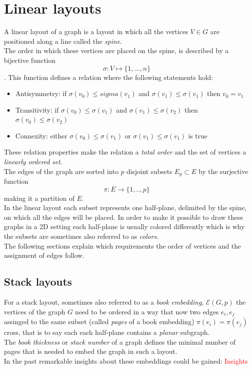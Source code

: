 \section{Linear layouts}
A linear layout of a graph is a layout in which all the vertices $V \in G$ are positioned along a line called the \textit{spine}.\\
The order in which these vertices are placed on the spine, is described by a bijective function $$\sigma : V \mapsto \{1,...,n\} $$. This function defines a relation where the following statements hold:
\begin{itemize}
\item Antisymmetry: if $\sigma(v_0) \leq sigma(v_1)$ and $\sigma(v_1) \leq \sigma(v_1)$ then $v_0 = v_1$
\item Transitivity: if $\sigma(v_0) \leq \sigma(v_1)$ and $\sigma(v_1) \leq \sigma(v_2)$ then $\sigma(v_0) \leq \sigma(v_2)$
\item Connexity: either $\sigma(v_0) \leq \sigma(v_1)$ or $\sigma(v_1) \leq \sigma(v_1)$ is true
\end{itemize}
These relation properties make the relation a \textit{total order} and the set of vertices a \textit{linearly ordered set}.\\
The edges of the graph are sorted into $p$ disjoint subsets $E_p \subset E$ by the surjective function 
$$ \pi: E \rightarrow \{1,..,p\} $$ making it a partition of $E$.\\
In the linear layout each subset represents one half-plane, delimited by the spine, on which all the edges will be placed.
In order to make it possible to draw these graphs in a 2D setting each half-plane is usually colored differently which is why the subsets are sometimes also referred to as \textit{colors}.\\
The following sections explain which requirements the order of vertices and the assignment of edges follow.
\subsection{Stack layouts}
For a stack layout, sometimes also referred to as a \textit{book embedding}, $\mathcal{E}(G,p)$ the vertices of the graph $G$ need to be ordered in a way that now two edges $e_i, e_j$ assinged to the same subset (called \textit{pages} of a book embedding) $\pi(e_i) = \pi(e_j)$ cross, that is to say each each half-plane contains a \textit{planar} subgraph.\\
The \textit{book thickness} or \textit{stack number} of a graph defines the minimal number of pages that is needed to embed the graph in such a layout.\\
In the past remarkable insights about these embeddings could be gained:
\textcolor{red}{Insights}\\
